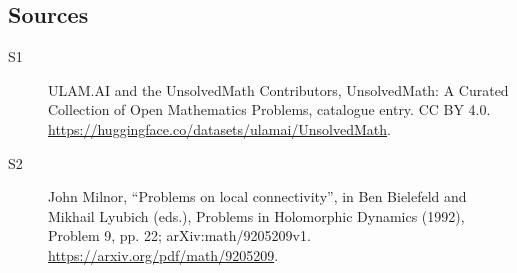 \documentclass[11pt]{article}
\begin{document}
\subsection{Sources}
\begin{description}
\item[\hypertarget{source:statement:1}{S1}] ULAM.AI and the UnsolvedMath Contributors, UnsolvedMath: A Curated Collection of Open Mathematics Problems, catalogue entry. CC BY 4.0. \url{https://huggingface.co/datasets/ulamai/UnsolvedMath}.
\item[\hypertarget{source:statement:2}{S2}] John Milnor, ``Problems on local connectivity'', in Ben Bielefeld and Mikhail Lyubich (eds.), Problems in Holomorphic Dynamics (1992), Problem 9, pp. 22; arXiv:math/9205209v1. \url{https://arxiv.org/pdf/math/9205209}.
\end{description}
\label{end:statement}
\end{document}
